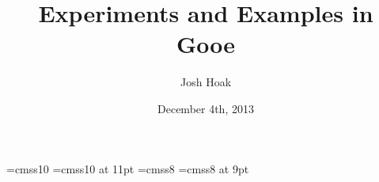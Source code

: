 \documentclass[a5paper]{article}
\begin{document}
\title{Experiments and Examples in Gooe}
\date{December 4th, 2013}
\author{Josh Hoak}
\maketitle

\font\tenpoint=cmss10
\font\tenpointeleven=cmss10 at 11pt
\font\eightpoint=cmss8
\font\eightpointnine=cmss8 at 9pt

\newdimen\bigRaise
\bigRaise=4.0pt
\newdimen\smallRaise
\smallRaise=3.5pt
\newdimen\inlineRaise
\inlineRaise=3.5pt

\def\eLblBig#1{\leavevmode\hbox to \goIntWd{
  \hss\raise\bigRaise\hbox{\rm \tenpointeleven{#1}}\hss}}
\def\goWsLblBig#1{\setbox0=\hbox{\0??!}
  \rlap{\0??!}\raise\bigRaise\hbox to \wd0{\hss\tenpointeleven{#1}\hss}}
\def\goBsLblBig#1{\setbox0=\hbox{\0??@}
  \rlap{\0??@}\raise\bigRaise\hbox to \wd0{\hss\color{white}
  \tenpointeleven{#1}\color{white}\hss}}

\def\emptyLabelPlusTriangle{\setbox0=\hbox{\0??+}
  \rlap{\0??+}\raise\smallRaise\hbox to \wd0{\hss \0??3 \hss}}

\def\eLbl#1{\leavevmode\hbox to \goIntWd{
  \hss\raise\smallRaise\hbox{\rm \tenpoint{#1}}\hss}}
\def\goWsLbl#1{\setbox0=\hbox{\0??!}
  \rlap{\0??!}\raise\smallRaise\hbox to \wd0{\hss\eightpointnine{#1}\hss}}
\def\goBsLbl#1{\setbox0=\hbox{\0??@}
  \rlap{\0??@}\raise\smallRaise\hbox to \wd0{\hss\color{white}
  \eightpointnine{#1}\color{white}\hss}}

\def\goinWsLbl#1{\textstone{\goo {\setbox0=\hbox{\0??!}
  \rlap{\0??!}\raise\inlineRaise\hbox to \wd0{\hss\eightpoint{#1}\hss}}}}
\def\goinBsLbl#1{\textstone{\goo {\setbox0=\hbox{\0??@}
  \rlap{\0??@}\raise\inlineRaise\hbox to \wd0{\hss\color{white}
  \eightpoint{#1}\color{white}\hss}}}}
\def\goinChar#1{\textstone{\goo {#1}}}

\end{document}
